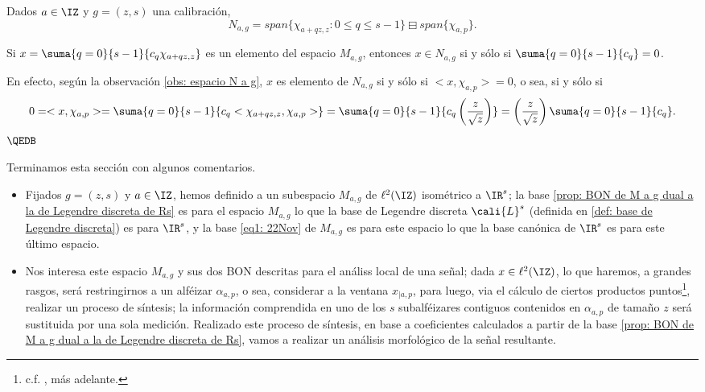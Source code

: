 \begin{obs} \label{obs: espacio N a g}
Dados $a \in \IZ$ y $g=(z,s)$
una calibración,
\[
N_{a,g}= span\{ \chi_{a+qz, z} : 0 \leq q \leq s-1 \} \boxminus span \{ \chi_{a, p}\}.
\]
\end{obs}

\begin{prop}
Si $x= \suma{q=0}{s-1}{c_{q}\chi_{a+qz,z}}$ es un elemento
del espacio $M_{a,g}$, entonces $x \in N_{a,g}$ si y sólo si
$\suma{q=0}{s-1}{c_{q}}=0$.
\end{prop}
\begin{dem}
En efecto, según la observación 
\ref{obs: espacio N a g}, $x$ es elemento de $N_{a,g}$
si y sólo si $<x, \chi_{a,p}>=0$, o sea, si y sólo si
\[
0=<x, \chi_{a,p}>=
\suma{q=0}{s-1}{c_{q}<\chi_{a+qz,z}, \chi_{a,p}>}
=\suma{q=0}{s-1}{c_{q}\left( \frac{z}{\sqrt{z}} \right)}
=\left( \frac{z}{\sqrt{z}} \right)\suma{q=0}{s-1}{c_{q}}.
\] 
$\QEDB$
\end{dem}

\noindent
Terminamos esta sección
con algunos comentarios.
\begin{itemize}
\item Fijados $g=(z,s)$ y $a \in \IZ$, hemos
definido a un subespacio $M_{a,g}$ de $\ell^{2}(\IZ)$
isométrico a $\IR^{s}$;
la base \eqref{prop: BON de M a g dual a la de Legendre discreta de Rs}
es para el espacio $M_{a,g}$ lo que la base de Legendre
discreta $\cali{L}^{s}$ (definida en 
\ref{def: base de Legendre discreta}) es para $\IR^{s}$,
y la base \eqref{eq1: 22Nov} de $M_{a,g}$ es para
este espacio lo que la base canónica de $\IR^{s}$
es para este último espacio.

\item Nos interesa este espacio $M_{a,g}$
y sus dos BON descritas para el análiss
local de una señal; 
dada $x \in \ell^{2}(\IZ)$,
lo que haremos, a grandes rasgos,
será restringirnos a un alféizar $\alpha_{a, p}$,
o sea, considerar a la ventana
$x_{|a, p}$, para luego, via el cálculo de
ciertos productos puntos\footnote{c.f.
, más adelante.}, realizar un proceso de 
síntesis; la información comprendida en uno de los $s$
subalféizares contiguos contenidos
en $\alpha_{a,p}$ de tamaño $z$ será sustituida
por una sola medición.
Realizado este proceso de síntesis, en base a coeficientes
calculados a partir de la base 
\eqref{prop: BON de M a g dual a la de Legendre discreta de Rs}, 
vamos a realizar un análisis morfológico de la señal
resultante. 
\end{itemize}

